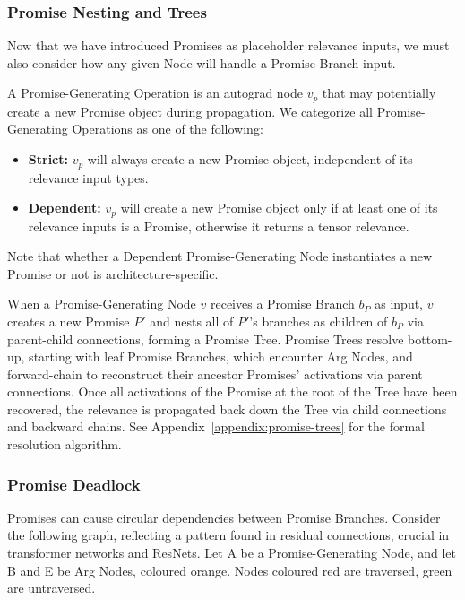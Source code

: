\documentclass{article}
\begin{document}
\subsubsection{Promise Nesting and Trees}
Now that we have introduced Promises as placeholder relevance inputs, we must also consider how any given Node will handle a Promise Branch input.
\begin{definition}
A Promise-Generating Operation is an autograd node $v_p$ that may potentially create a new Promise object during propagation.
We categorize all Promise-Generating Operations as one of the following:
\begin{itemize}
  \item \textbf{Strict: }$v_p$ will always create a new Promise object, independent of its relevance input types.
  \item \textbf{Dependent: }$v_p$ will create a new Promise object only if at least one of its relevance inputs is a Promise, otherwise it returns a tensor relevance.
\end{itemize}

Note that whether a Dependent Promise-Generating Node instantiates a new Promise or not is architecture-specific.

When a Promise-Generating Node $v$ receives a Promise Branch $b_P$ as input, $v$ creates a new Promise $P'$ and nests all of $P'$'s branches as children of $b_P$ via parent-child connections, forming a Promise Tree.
Promise Trees resolve bottom-up, starting with leaf Promise Branches, which encounter Arg Nodes, and forward-chain to reconstruct their
ancestor Promises' activations via parent connections. Once all activations of the Promise at the root of the Tree have been recovered, the relevance is propagated back down the Tree via child connections
and backward chains. See Appendix~\ref{appendix:promise-trees} for the formal resolution algorithm.

\subsubsection{Promise Deadlock}
Promises can cause circular dependencies between Promise Branches. Consider the following graph, reflecting a pattern found in
residual connections, crucial in transformer networks and ResNets. Let A be a Promise-Generating Node, and let B and E be Arg Nodes, coloured orange.
Nodes coloured red are traversed, green are untraversed.

\begin{center}
\end{center}
\end{definition}
\end{document}
